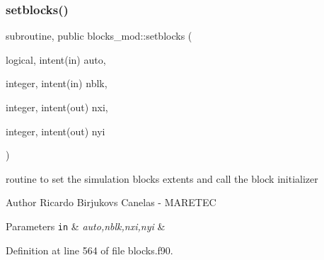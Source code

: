 \subsubsection{\texorpdfstring{setblocks()}{setblocks()}}
{\footnotesize\ttfamily subroutine, public blocks\+\_\+mod\+::setblocks (\begin{DoxyParamCaption}\item[{logical, intent(in)}]{auto,  }\item[{integer, intent(in)}]{nblk,  }\item[{integer, intent(out)}]{nxi,  }\item[{integer, intent(out)}]{nyi }\end{DoxyParamCaption})}



routine to set the simulation blocks extents and call the block initializer 

\begin{DoxyAuthor}{Author}
Ricardo Birjukovs Canelas -\/ M\+A\+R\+E\+T\+EC 
\end{DoxyAuthor}

\begin{DoxyParams}[1]{Parameters}
\mbox{\tt in}  & {\em auto,nblk,nxi,nyi} & \\
\hline
\end{DoxyParams}


Definition at line 564 of file blocks.\+f90.


